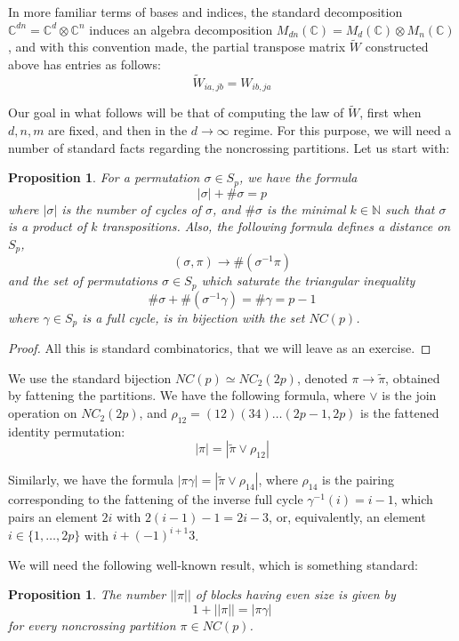 \documentclass[12pt]{amsbook}
\newtheorem{proposition}[theorem]{Proposition}
\begin{document}
In more familiar terms of bases and indices, the standard decomposition $\mathbb C^{dn}=\mathbb C^d\otimes\mathbb C^n$ induces an algebra decomposition $M_{dn}(\mathbb C)=M_d(\mathbb C)\otimes M_n(\mathbb C)$, and with this convention made, the partial transpose matrix $\widetilde{W}$ constructed above has entries as follows:
$$\widetilde{W}_{ia,jb}=W_{ib,ja}$$

Our goal in what follows will be that of computing the law of $\widetilde{W}$, first when $d,n,m$ are fixed, and then in the $d\to\infty$ regime. For this purpose, we will need a number of standard facts regarding the noncrossing partitions. Let us start with:

\begin{proposition}
For a permutation $\sigma\in S_p$, we have the formula
$$|\sigma|+\#\sigma=p$$
where $|\sigma|$ is the number of cycles of $\sigma$, and $\#\sigma$ is the minimal $k\in\mathbb N$ such that $\sigma$ is a product of $k$ transpositions. Also, the following formula defines a distance on $S_p$, 
$$(\sigma,\pi)\to\#(\sigma^{-1}\pi)$$
and the set of permutations $\sigma\in S_p$ which saturate the triangular inequality 
$$\#\sigma+\#(\sigma^{-1}\gamma)=\#\gamma=p-1$$
where $\gamma\in S_p$ is a full cycle, is in bijection with the set $NC(p)$. 
\end{proposition}

\begin{proof}
All this is standard combinatorics, that we will leave as an exercise.
\end{proof}

We use the standard bijection $NC(p)\simeq NC_2(2p)$, denoted $\pi\to\widetilde{\pi}$, obtained by fattening the partitions. We have the following formula,  where $\vee$ is the join operation on $NC_2(2p)$, and $\rho_{12} = (12)(34)\ldots(2p-1,2p)$ is the fattened identity permutation:
$$|\pi|=|\widetilde{\pi}\vee\rho_{12}|$$

Similarly, we have the formula $|\pi\gamma|=|\widetilde{\pi}\vee\rho_{14}|$, where $\rho_{14}$ is the pairing corresponding to the fattening of the inverse full cycle $\gamma^{-1}(i) = i-1$, which pairs an element $2i$ with $2(i-1)-1 = 2i-3$, or, equivalently, an element $i \in \{1, \ldots, 2p\}$ with $i+(-1)^{i+1}3$.

\bigskip

We will need the following well-known result, which is something standard:

\begin{proposition}
The number $||\pi||$ of blocks having even size is given by
$$1+||\pi||=|\pi\gamma|$$
for every noncrossing partition $\pi \in NC(p)$.
\end{proposition}
\end{document}
